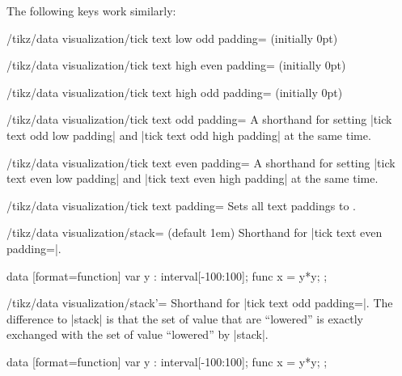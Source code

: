 The following keys work similarly:
%
\begin{key}{/tikz/data visualization/tick text low odd padding= (initially 0pt)}
\end{key}
%
\begin{key}{/tikz/data visualization/tick text high even padding= (initially 0pt)}
\end{key}
%
\begin{key}{/tikz/data visualization/tick text high odd padding= (initially 0pt)}
\end{key}

\begin{key}{/tikz/data visualization/tick text odd padding=}
    A shorthand for setting |tick text odd low padding| and
    |tick text odd high padding| at the same time.
\end{key}

\begin{key}{/tikz/data visualization/tick text even padding=}
    A shorthand for setting |tick text even low padding| and
    |tick text even high padding| at the same time.
\end{key}

\begin{key}{/tikz/data visualization/tick text padding=}
    Sets all text paddings to .
\end{key}

\begin{key}{/tikz/data visualization/stack= (default 1em)}
    Shorthand for |tick text even padding=|.
\begin{codeexample}[preamble={\usetikzlibrary{datavisualization.formats.functions}}]
\tikz \datavisualization [scientific axes,
                          all axes={length=2.5cm},
                          x axis={ticks={stack=1.5em}},
                          visualize as smooth line]
  data [format=function] {
    var y : interval[-100:100];
    func x = \value y*\value y;
  };
\end{codeexample}
\end{key}

\begin{key}{/tikz/data visualization/stack'=}
    Shorthand for |tick text odd padding=|. The difference to
    |stack| is that the set of value that are ``lowered'' is exactly exchanged
    with the set of value ``lowered'' by |stack|.
\begin{codeexample}[preamble={\usetikzlibrary{datavisualization.formats.functions}}]
\tikz \datavisualization [scientific axes,
                          all axes={length=2.5cm},
                          x axis={ticks=stack'},
                          visualize as smooth line]
  data [format=function] {
    var y : interval[-100:100];
    func x = \value y*\value y;
  };
\end{codeexample}
\end{key}

